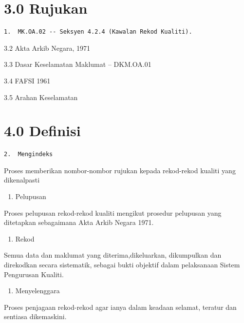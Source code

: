 \documentclass[
]{article}
\providecommand{\tightlist}{%
  \setlength{\itemsep}{0pt}\setlength{\parskip}{0pt}}
\begin{document}
\hypertarget{rujukan}{%
\section{3.0 Rujukan}\label{rujukan}}

\begin{verbatim}
1.  MK.OA.02 -- Seksyen 4.2.4 (Kawalan Rekod Kualiti).
\end{verbatim}

3.2 Akta Arkib Negara, 1971

3.3 Dasar Keselamatan Maklumat -- DKM.OA.01

3.4 FAFSI 1961

3.5 Arahan Keselamatan

\hypertarget{definisi}{%
\section{4.0 Definisi}\label{definisi}}

\begin{verbatim}
2.  Mengindeks
\end{verbatim}

Proses memberikan nombor-nombor rujukan kepada rekod-rekod kualiti yang
dikenalpasti

\begin{enumerate}
\def\labelenumi{\arabic{enumi}.}
\setcounter{enumi}{2}
\tightlist
\item
  Pelupusan
\end{enumerate}

Proses pelupusan rekod-rekod kualiti mengikut prosedur pelupusan yang
ditetapkan sebagaimana Akta Arkib Negara 1971.

\begin{enumerate}
\def\labelenumi{\arabic{enumi}.}
\setcounter{enumi}{3}
\tightlist
\item
  Rekod
\end{enumerate}

Semua data dan maklumat yang diterima,dikeluarkan, dikumpulkan dan
direkodkan secara sistematik, sebagai bukti objektif dalam pelaksanaan
Sistem Pengurusan Kualiti.

\begin{enumerate}
\def\labelenumi{\arabic{enumi}.}
\setcounter{enumi}{4}
\tightlist
\item
  Menyelenggara
\end{enumerate}

Proses penjagaan rekod-rekod agar ianya dalam keadaan selamat, teratur
dan sentiasa dikemaskini.
\end{document}
